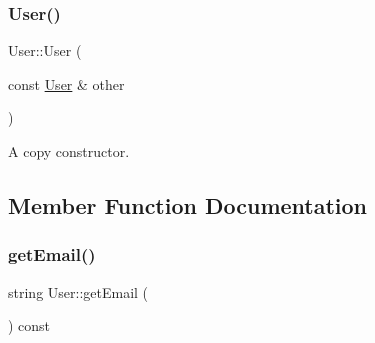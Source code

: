 \subsubsection{\texorpdfstring{User()}{User()}\hspace{0.1cm}{\footnotesize\ttfamily [2/2]}}
{\footnotesize\ttfamily User\+::\+User (\begin{DoxyParamCaption}\item[{const \hyperlink{class_user}{User} \&}]{other }\end{DoxyParamCaption})}

A copy constructor. 

\subsection{Member Function Documentation}
\mbox{\label{class_user_a4c647e583bd964f40f687776a0d185dc}} 
\subsubsection{\texorpdfstring{get\+Email()}{getEmail()}}
{\footnotesize\ttfamily string User\+::get\+Email (\begin{DoxyParamCaption}{ }\end{DoxyParamCaption}) const\hspace{0.3cm}{\ttfamily [inline]}}

